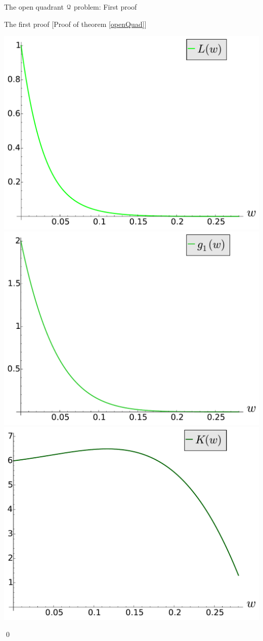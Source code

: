 \documentclass[11pt, a4paper, english, twoside, notitlepage, openright]{report}
\begin{document}
\begin{chapter}{The open quadrant $\mathcal{Q}$ problem: First proof}
\begin{section}{The first proof} [Proof of theorem \ref{openQuad}]
\begin{center}
\includegraphics[width=0.45\linewidth]{plots/ch1_16_L.pdf}
\includegraphics[width=0.45\linewidth]{plots/ch1_17_g_1.pdf} \\
\includegraphics[width=0.45\linewidth]{plots/ch1_18_K.pdf}		
\end{center}
\qed
\end{section}
\end{chapter}
\end{document}
